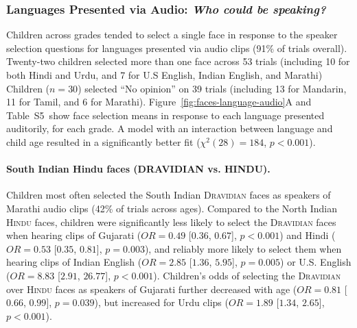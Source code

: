 \documentclass{foushee-adapted-preprint}
\newcommand{\faceaudiomeanstab}{S5}
\begin{document}
\subsubsection{Languages Presented via Audio: \textit{Who could be speaking?}} 
Children across grades tended to select a single face in response to the speaker selection questions for languages presented via audio clips (91\% of trials overall). %
Twenty-two children selected more than one face across 53 trials (including 10 for both Hindi and Urdu, and 7 for U.S English, Indian English, and Marathi) %
Children ($n=30$) selected ``No opinion'' on 39 trials (including 13 for Mandarin, 11 for Tamil, and 6 for Marathi). %
Figure~\ref{fig:faces-language-audio}A and Table~\faceaudiomeanstab\ show face selection means in response to each language presented auditorily, for each grade. A model with an interaction between language and child age resulted in a significantly better fit ($\chi^{2}(28)=184$, $p<0.001$). 

\paragraph{South Indian Hindu faces {(D{\small{RAVIDIAN}} vs. H{\small{INDU}})}.} 
Children most often selected the South Indian \textsc{Dravidian} faces as speakers of Marathi audio clips (42\% of trials across ages). 
Compared to the North Indian \textsc{Hindu} faces, children were significantly less likely to select the \textsc{Dravidian} faces when hearing clips of Gujarati ($OR=0.49$ [$0.36$, $0.67$], $p<0.001$) and Hindi ($OR=0.53$ [$0.35$, $0.81$], $p=0.003$), and reliably more likely to select them when hearing clips of Indian English ($OR=2.85$ [$1.36$, $5.95$], $p=0.005$) or U.S. English ($OR=8.83$ [$2.91$, $26.77$], $p<0.001$). 
Children's odds of selecting the \textsc{Dravidian} over \textsc{Hindu} faces as speakers of Gujarati further decreased with age ($OR=0.81$ [$0.66$, $0.99$], $p=0.039$), but increased for Urdu clips ($OR=1.89$ [$1.34$, $2.65$], $p<0.001$). 

\end{document}
